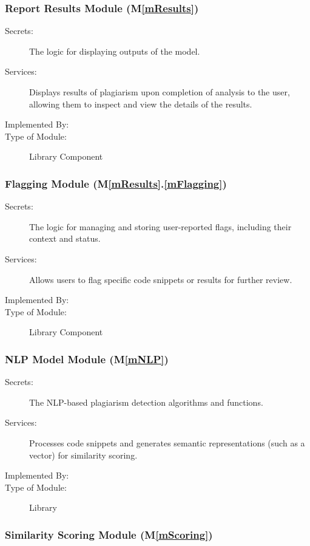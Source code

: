 \documentclass[12pt, titlepage]{article}
\newcommand{\mref}[1]{M\ref{#1}}
\newcommand{\smref}[2]{M\ref{#1}.\ref{#2}}
\begin{document}
\subsubsection{Report Results Module (\mref{mResults})}

\begin{description}
\item[Secrets:] The logic for displaying outputs of the model.
\item[Services:] Displays results of plagiarism upon completion of analysis to the user, allowing them to inspect and view the details of the results.
\item[Implemented By:] \progname{}
\item[Type of Module:] Library Component
\end{description}

\subsubsection{Flagging Module (\smref{mResults}{mFlagging})}

\begin{description}
\item[Secrets:] The logic for managing and storing user-reported flags, including their context and status.
\item[Services:] Allows users to flag specific code snippets or results for further review.
\item[Implemented By:] \progname{}
\item[Type of Module:] Library Component
\end{description}

\subsubsection{NLP Model Module (\mref{mNLP})}

\begin{description}
\item[Secrets:] The NLP-based plagiarism detection algorithms and functions.
\item[Services:] Processes code snippets and generates semantic representations (such as a vector) 
for similarity scoring.
\item[Implemented By:] \progname{}
\item[Type of Module:] Library
\end{description}

\subsubsection{Similarity Scoring Module (\mref{mScoring})}
\end{document}
